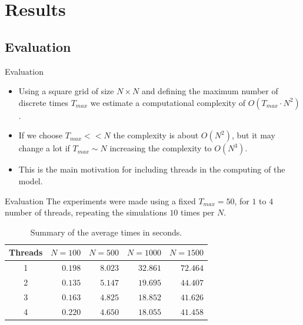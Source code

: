 \documentclass{beamer}
\begin{document}
  \section{Results}
      \subsection{Evaluation}
      
      \begin{frame}{Evaluation}
        \begin{itemize}
          \item<1-> Using a square grid of size $N \times N$ and defining the maximum number
            of discrete times $T_{max}$ we estimate a computational complexity of $O(T_{max}\cdot N^2)$. 
          \item<2-> If we choose $T_{max} << N$ the complexity is about $O(N^2)$, but it 
            may change a lot if $T_{max}\sim N$ increasing the complexity to $O(N^3)$. 
          \item<3-> This is the main motivation for including threads in the computing of the model.
        \end{itemize} 
      \end{frame}
      
      \begin{frame}{Evaluation}
        The experiments were made using a fixed $T_{max}=50$, for $1$ to $4$ number of threads, repeating the 
        simulations $10$ times per $N$.
        \begin{table}[!ht]
          \renewcommand{\arraystretch}{1.3}
          \centering
          \caption{Summary of the average times in seconds.}
          \label{tab:results}
          \begin{tabular}{c||rrrr}
            \hline
            Threads & $N=100$ & $N=500$ & $N=1000$ & $N=1500$ \\ \hline\hline
            1       & $0.198$   & $8.023$   & $32.861$   & $72.464$   \\
            2       & $0.135$   & $5.147$   & $19.695$   & $44.407$   \\
            3       & $0.163$   & $4.825$   & $18.852$   & $41.626$   \\
            4       & $0.220$   & $4.650$   & $18.055$   & $41.458$  
          \end{tabular}
        \end{table}
      \end{frame}
      
\end{document}
